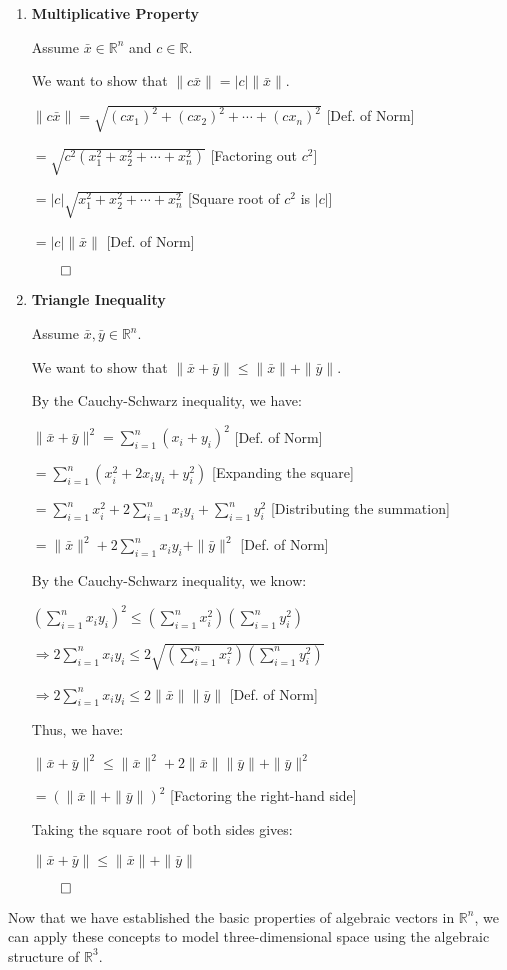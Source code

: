 \begin{proofbox}
\begin{enumerate}[label=\arabic*., resume=normprops]


\item \textbf{Multiplicative Property}
    
    Assume $\bar{x} \in \mathbb{R}^n$ and $c \in \mathbb{R}$.

    We want to show that $\|c \bar{x}\| = |c| \|\bar{x}\|$.

    \quad $\|c \bar{x}\| = \sqrt{(c x_1)^2 + (c x_2)^2 + \cdots + (c x_n)^2}$ \hfill [Def. of Norm]

    \quad $= \sqrt{c^2 (x_1^2 + x_2^2 + \cdots + x_n^2)}$ \hfill [Factoring out $c^2$]

    \quad $= |c| \sqrt{x_1^2 + x_2^2 + \cdots + x_n^2}$ \hfill [Square root of $c^2$ is $|c|$]

    \quad $= |c| \|\bar{x}\|$ \hfill [Def. of Norm]

    \hfill $\qed$

    \item \textbf{Triangle Inequality}
    
    Assume $\bar{x}, \bar{y} \in \mathbb{R}^n$.

    We want to show that $\|\bar{x} + \bar{y}\| \leq \|\bar{x}\| + \|\bar{y}\|$.

    By the Cauchy-Schwarz inequality, we have:

    \quad $\|\bar{x} + \bar{y}\|^2 = \sum_{i=1}^n (x_i + y_i)^2$ \hfill [Def. of Norm]

    \quad $= \sum_{i=1}^n (x_i^2 + 2 x_i y_i + y_i^2)$ \hfill [Expanding the square]

    \quad $= \sum_{i=1}^n x_i^2 + 2 \sum_{i=1}^n x_i y_i + \sum_{i=1}^n y_i^2$ \hfill [Distributing the summation]

    \quad $= \|\bar{x}\|^2 + 2 \sum_{i=1}^n x_i y_i + \|\bar{y}\|^2$ \hfill [Def. of Norm]

    By the Cauchy-Schwarz inequality, we know:

    \quad $\left( \sum_{i=1}^n x_i y_i \right)^2 \leq \left( \sum_{i=1}^n x_i^2 \right) \left( \sum_{i=1}^n y_i^2 \right)$

    \quad $\Rightarrow 2 \sum_{i=1}^n x_i y_i \leq 2 \sqrt{\left( \sum_{i=1}^n x_i^2 \right) \left( \sum_{i=1}^n y_i^2 \right)}$

    \quad $\Rightarrow 2 \sum_{i=1}^n x_i y_i \leq 2 \|\bar{x}\| \|\bar{y}\|$ \hfill [Def. of Norm]

    Thus, we have:

    \quad $\|\bar{x} + \bar{y}\|^2 \leq \|\bar{x}\|^2 + 2 \|\bar{x}\| \|\bar{y}\| + \|\bar{y}\|^2$

    \quad $= (\|\bar{x}\| + \|\bar{y}\|)^2$ \hfill [Factoring the right-hand side]

    Taking the square root of both sides gives:

    \quad $\|\bar{x} + \bar{y}\| \leq \|\bar{x}\| + \|\bar{y}\|$

    \hfill $\qed$
    
\end{enumerate}
\end{proofbox}

Now that we have established the basic properties of algebraic vectors in $\mathbb{R}^n$, we can apply these concepts to model
three-dimensional space using the algebraic structure of $\mathbb{R}^3$.



\newpage
  